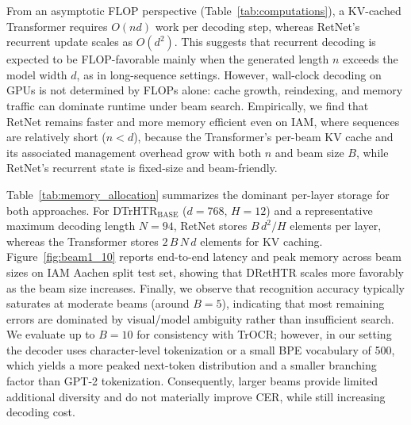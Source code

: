 \documentclass[times, review, 10pt]{elsarticle}
\begin{document}
From an asymptotic FLOP perspective (Table~\ref{tab:computations}), a KV-cached Transformer requires $O(nd)$ work per decoding step, whereas RetNet’s recurrent update scales as $O(d^2)$. This suggests that recurrent decoding is expected to be FLOP-favorable mainly when the generated length $n$ exceeds the model width $d$, as in long-sequence settings. However, wall-clock decoding on GPUs is not determined by FLOPs alone: cache growth, reindexing, and memory traffic can dominate runtime under beam search. Empirically, we find that RetNet remains faster and more memory efficient even on IAM, where sequences are relatively short ($n<d$), because the Transformer’s per-beam KV cache and its associated management overhead grow with both $n$ and beam size $B$, while RetNet’s recurrent state is fixed-size and beam-friendly.

Table~\ref{tab:memory_allocation} summarizes the dominant per-layer storage for both approaches. For DTrHTR$_{\text{BASE}}$ ($d{=}768$, $H{=}12$) and a representative maximum decoding length $N=94$, RetNet stores $B\,d^2/H$ elements per layer, whereas the Transformer stores $2\,B\,N\,d$ elements for KV caching. Figure~\ref{fig:beam1_10} reports end-to-end latency and peak memory across beam sizes on IAM Aachen split test set, showing that DRetHTR scales more favorably as the beam size increases. Finally, we observe that recognition accuracy typically saturates at moderate beams (around $B{=}5$), indicating that most remaining errors are dominated by visual/model ambiguity rather than insufficient search. We evaluate up to $B{=}10$ for consistency with TrOCR; however, in our setting the decoder uses character-level tokenization or a small BPE vocabulary of 500, which yields a more peaked next-token distribution and a smaller branching factor than GPT-2 tokenization. Consequently, larger beams provide limited additional diversity and do not materially improve CER, while still increasing decoding cost.
\end{document}
